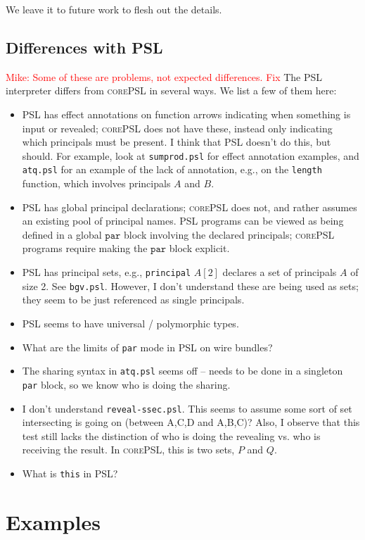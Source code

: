 \documentclass[10pt]{article}
\newcommand{\kw}[1]{\ensuremath{\mathtt{#1}}}
\newcommand{\lang}{\textsc{corePSL}\xspace}
\newcommand{\mwh}[1]{\textcolor{red}{Mike: #1}}
\begin{document}
We leave it to future work to flesh out the details. 

\subsection{Differences with PSL}

\mwh{Some of these are problems, not expected differences. Fix}
The PSL interpreter differs from \lang in several ways. We list a few
of them here:
\begin{itemize}
\item PSL has effect annotations on function arrows indicating when
  something is input or revealed; \lang does not have these,
  instead only indicating which principals must be present. I think
  that PSL doesn't do this, but should. For example, look at
  \texttt{sumprod.psl} for effect annotation examples, and
  \texttt{atq.psl} for an example of the lack of annotation, e.g., on
  the \texttt{length} function, which involves principals $A$ and $B$.
\item PSL has global principal declarations; \lang does not, and
  rather assumes an existing pool of principal names. PSL programs can
  be viewed as being defined in a global $\kw{par}$ block involving
  the declared principals; \lang programs require making the
  $\kw{par}$ block explicit.
\item PSL has principal sets, e.g., \texttt{principal} $A[2]$ declares
  a set of principals $A$ of size 2. See \texttt{bgv.psl}. However, I
  don't understand these are being used as sets; they seem to be just
  referenced as single principals.
\item PSL seems to have universal / polymorphic types.
\item What are the limits of \texttt{par} mode in PSL on wire bundles?
\item The sharing syntax in \texttt{atq.psl} seems off -- needs to be
  done in a singleton \texttt{par} block, so we know who is doing the
  sharing.
\item I don't understand \texttt{reveal-ssec.psl}. This seems to
  assume some sort of set intersecting is going on (between A,C,D and
  A,B,C)? Also, I observe that this test still lacks the distinction
  of who is doing the revealing vs. who is receiving the result. In
  \lang, this is two sets, $P$ and $Q$.
\item What is \texttt{this} in PSL?
\end{itemize}

\section{Examples}
\label{sec:examples}
\end{document}
